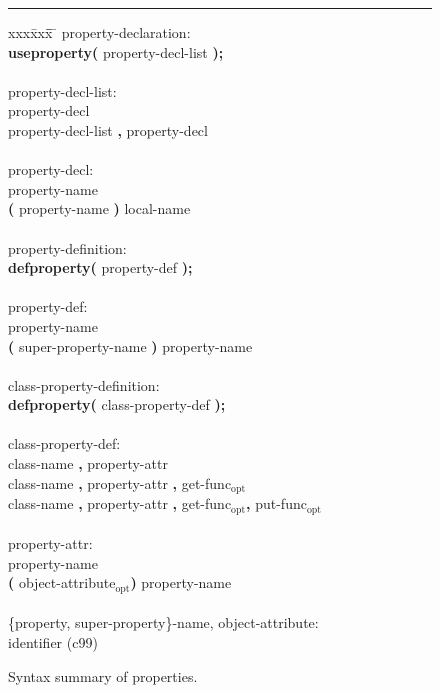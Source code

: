 \documentclass[preprint,10pt]{sigplanconf}
\newcommand{\ttb}[1]{{\normalfont\ttfamily\bfseries #1}}
\newcommand{\opt}{\ensuremath{_{\text{opt}}}\xspace}
\newcommand{\hr}{\rule{\columnwidth}{0.33pt}}
\begin{document}
\begin{figure}\hr
\begin{center}
{\em
\begin{tabbing}
xxx\= xxx\= \hspace*{17em}\= \hspace*{2em} \= \kill
property-declaration: \\
\> \ttb{useproperty(} property-decl-list \ttb{);} \\
\\
property-decl-list: \\
\> property-decl \\
\> property-decl-list \ttb{,} property-decl \\
\\
property-decl: \\
\> property-name \\
\> \ttb{(} property-name \ttb{)} local-name \\
\\
property-definition: \\
\> \ttb{defproperty(} property-def \ttb{);} \\
\\
property-def: \\
\> property-name \\
\> \ttb{(} super-property-name \ttb{)} property-name \\
\\
class-property-definition: \\
\> \ttb{defproperty(} class-property-def \ttb{);} \\
\\
class-property-def: \\
\> class-name \ttb{,} property-attr \\
\> class-name \ttb{,} property-attr \ttb{,} get-func\opt \\
\> class-name \ttb{,} property-attr \ttb{,} get-func\opt \ttb{,} put-func\opt \\
\\
property-attr: \\
\> property-name \\
\> \ttb{(} object-attribute\opt \ttb{)} property-name \\
\\
\{property, super-property\}-name, object-attribute: \\
\> identifier					\>\>\> (c99)
\end{tabbing}
}
\end{center}
\caption{Syntax summary of properties.\label{fig:prpgram}}
\end{figure}
\end{document}
